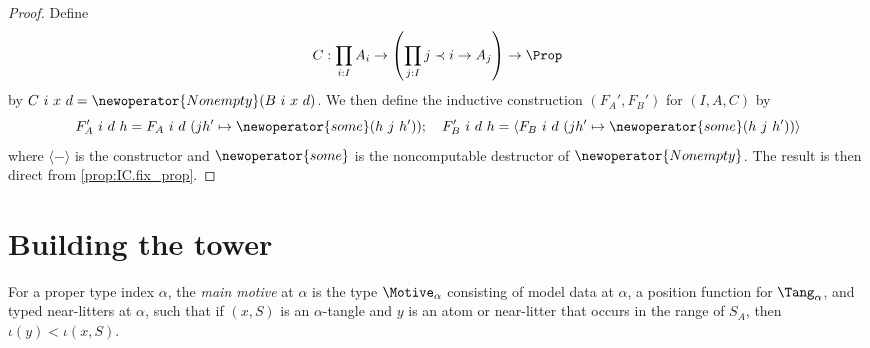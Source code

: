 \begin{proof}
  Define
  \[ C : \prod_{i : I} A_i \to \left(\prod_{j : I} j \prec i \to A_j\right) \to \Prop \]
  by \( C\ i\ x\ d = \newoperator{Nonempty}(B\ i\ x\ d) \).
  We then define the inductive construction \( (F_A', F_B') \) for \( (I, A, C) \) by
  \[ F_A'\ i\ d\ h = F_A\ i\ d\ (j h' \mapsto \newoperator{some}(h\ j\ h'));\quad F_B'\ i\ d\ h = \langle F_B\ i\ d\ (j h' \mapsto \newoperator{some}(h\ j\ h')) \rangle \]
  where \( \langle-\rangle \) is the constructor and \( \newoperator{some} \) is the noncomputable destructor of \( \newoperator{Nonempty} \).
  The result is then direct from \cref{prop:IC.fix_prop}.
\end{proof}

\section{Building the tower}
\begin{definition}
  \label{def:MainMotive}
  For a proper type index \( \alpha \), the \emph{main motive} at \( \alpha \) is the type \( \Motive_\alpha \) consisting of model data at \( \alpha \), a position function for \( \Tang_\alpha \), and typed near-litters at \( \alpha \), such that if \( (x, S) \) is an \( \alpha \)-tangle and \( y \) is an atom or near-litter that occurs in the range of \( S_A \), then \( \iota(y) < \iota(x, S) \).
\end{definition}
